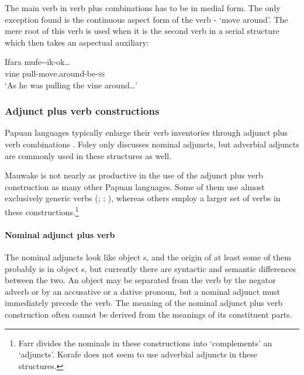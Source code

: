 The main verb in verb plus  combinations has to be in medial form. The only exception found is the continuous aspect form of the verb - `move around'. The mere root of this verb is used when it is the second verb in a serial structure which then takes an aspectual auxiliary:

\ea%
\label{ex:3:x391}
\gll Ifara mufe--ik-ok{\dots} \\
vine pull-move.around-be-\textsc{ss} \\
\glt`As he was pulling the vine around{\dots}'
\z

\subsubsection{Adjunct plus verb constructions} \label{sec:3:z:y:x}
{}
Papuan languages typically enlarge their verb inventories through adjunct plus verb combinations \citep[127]{Foley1986}. Foley only discusses nominal adjuncts, but adverbial adjuncts are commonly used in these structures as well. 

Mauwake is not nearly as productive in the use of the adjunct plus verb construction as many other Papuan languages. Some of them use almost exclusively generic verbs (\citealt[117]{Foley1986}; \citealt[309]{Roberts1987}; \citealt[145]{Whitehead2004}), whereas others employ a larger set of verbs \citep[62--66]{Farr1999} in these constructions.\footnote{Farr divides the nominals in these constructions into `complements' an `adjuncts'. Korafe does not seem to use adverbial adjuncts in these structures. } 

\paragraph{Nominal adjunct plus verb}\label{sec:3:a:z:y:x}
{}
The nominal adjuncts look like object s, and the origin of at least some of them probably is in object s, but currently there are syntactic and semantic differences between the two. An object  may be separated from the verb by the negator adverb  or by an accusative or a dative pronoun, but a nominal adjunct must immediately precede the verb. The meaning of the nominal adjunct plus verb construction often cannot be derived from the meanings of its constituent parts. 

